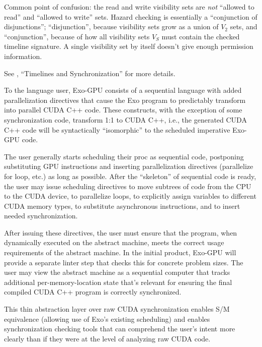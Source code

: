 \filbreak
Common point of confusion: the read and write visibility sets are \textit{not} ``allowed to read'' and ``allowed to write'' sets.
Hazard checking is essentially a ``conjunction of disjunctions''; ``disjunction'', because visibility sets grow as a union of $V_2$ sets, and ``conjunction'', because of how all visibility sets $V_S$ must contain the checked timeline signature.
A single visibility set by itself doesn't give enough permission information.

\filbreak
See , ``Timelines and Synchronization'' for more details.

\filbreak
{}


To the language user, Exo-GPU consists of a sequential language with added parallelization directives that cause the Exo program to predictably transform into parallel CUDA C++ code.
These constructs, with the exception of some synchronization code, transform 1:1 to CUDA C++, i.e., the generated CUDA C++ code will be syntactically ``isomorphic'' to the scheduled imperative Exo-GPU code.

\filbreak
The user generally starts scheduling their proc as sequential code, postponing substituting GPU instructions and inserting parallelization directives (parallelize for loop, etc.) as long as possible.
After the ``skeleton'' of sequential code is ready, the user may issue scheduling directives to move subtrees of code from the CPU to the CUDA device, to parallelize loops, to explicitly assign variables to different CUDA memory types, to substitute asynchronous instructions, and to insert needed synchronization.

\filbreak
After issuing these directives, the user must ensure that the program, when dynamically executed on the abstract machine, meets the correct usage requirements of the abstract machine.
In the initial product, Exo-GPU will provide a separate linter step that checks this for concrete problem sizes.
The user may view the abstract machine as a sequential computer that tracks additional per-memory-location state that's relevant for ensuring the final compiled CUDA C++ program is correctly synchronized.

\filbreak
This thin abstraction layer over raw CUDA synchronization enables S/M equivalence (allowing use of Exo's existing scheduling) and enables synchronization checking tools that can comprehend the user's intent more clearly than if they were at the level of analyzing raw CUDA code.

